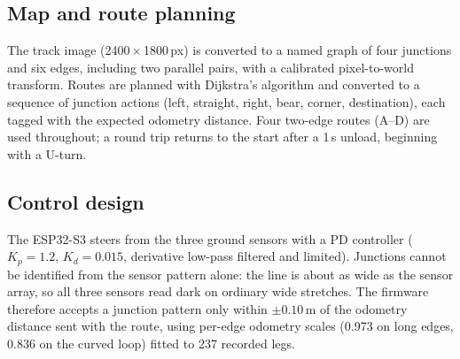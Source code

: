 \documentclass[conference]{IEEEtran}
\begin{document}
\subsection{Map and route planning}
The track image (2400\,$\times$\,1800\,px) is converted to a named graph of four
junctions and six edges, including two parallel pairs, with a calibrated
pixel-to-world transform. Routes are planned with Dijkstra's
algorithm and converted to a sequence of junction actions
(left, straight, right, bear, corner, destination), each tagged with the
expected odometry distance. Four two-edge routes (A--D) are used throughout;
a round trip returns to the start after a 1\,s unload, beginning with a U-turn.

\subsection{Control design}
The ESP32-S3 steers from the three ground sensors with a PD controller
($K_p=1.2$, $K_d=0.015$, derivative low-pass filtered and limited). Junctions
cannot be identified from the sensor pattern alone: the line is about as wide as
the sensor array, so all three sensors read dark on ordinary wide stretches.
The firmware therefore accepts a junction pattern only within $\pm0.10$\,m of the
odometry distance sent with the route, using per-edge odometry scales
(0.973 on long edges, 0.836 on the curved loop) fitted to 237 recorded legs.
\end{document}
